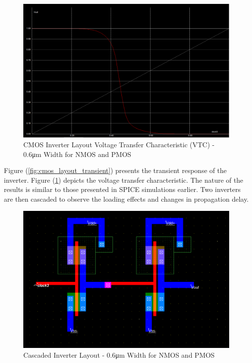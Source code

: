 \FloatBarrier

\FloatBarrier

\begin{figure}[h!]
	\centering
	\includegraphics[scale=0.50]{./images/inverter_vtc_06nmos_06pmos.PNG}
	\caption{CMOS Inverter Layout Voltage Transfer Characteristic (VTC) - 0.6\si{\micro\meter} Width for NMOS and PMOS}
	\label{fig:cmos_layout_vtc}
\end{figure}

\FloatBarrier

Figure (\ref{fig:cmos_layout_transient}) presents the transient response of the inverter.
Figure (\ref{fig:cmos_layout_vtc}) depicts the voltage transfer characteristic.
The nature of the results is similar to those presented in SPICE simulations earlier.
Two inverters are then cascaded to observe the loading effects and changes in propagation delay.

\FloatBarrier

\begin{figure}[h!]
	\centering
	\includegraphics[scale=0.75]{./images/cascaded_inverter_06nmos06pmos.PNG}
	\caption{Cascaded Inverter Layout - 0.6\si{\micro\meter} Width for NMOS and PMOS}
	\label{fig:cascaded_inverter_06nmos06pmos}
\end{figure}

